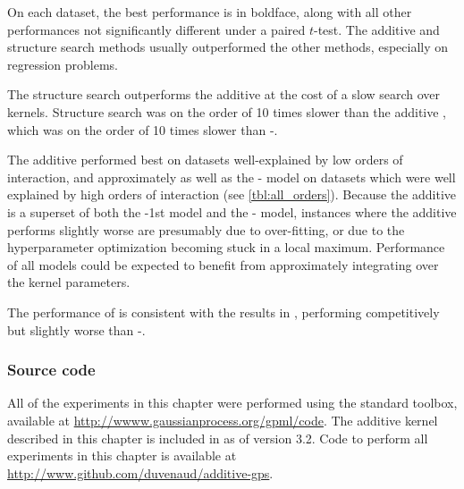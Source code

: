 On each dataset, the best performance is in boldface, along with all other performances not significantly different under a paired $t$-test.
The additive and structure search methods usually outperformed the other methods, especially on regression problems.


The structure search outperforms the additive \gp{} at the cost of a slow search over kernels.
Structure search was on the order of 10 times slower than the additive \gp{}, which was on the order of 10 times slower than \gp{}-\kSE{}.

The additive \gp{} performed best on datasets well-explained by low orders of interaction, and approximately as well as the \SE{}-\gp{} model on datasets which were well explained by high orders of interaction (see \cref{tbl:all_orders}).
Because the additive \gp{} is a superset of both the \gp{}-1st model and the \gp{}-\kSE{} model, instances where the additive \gp{} performs slightly worse are presumably due to over-fitting, or due to the hyperparameter optimization becoming stuck in a local maximum. %
Performance of all \gp{} models could be expected to benefit from approximately integrating over the kernel parameters.

The performance of \HKL{} is consistent with the results in \citet{Bach_HKL}, performing competitively but slightly worse than \SE{}-\gp{}.


\subsubsection{Source code}

All of the experiments in this chapter were performed using the standard \GPML{} toolbox, available at \url{http://wwww.gaussianprocess.org/gpml/code}.
The additive kernel described in this chapter is included in \GPML{} as of version 3.2.
Code to perform all experiments in this chapter is available at \url{http://www.github.com/duvenaud/additive-gps}.





